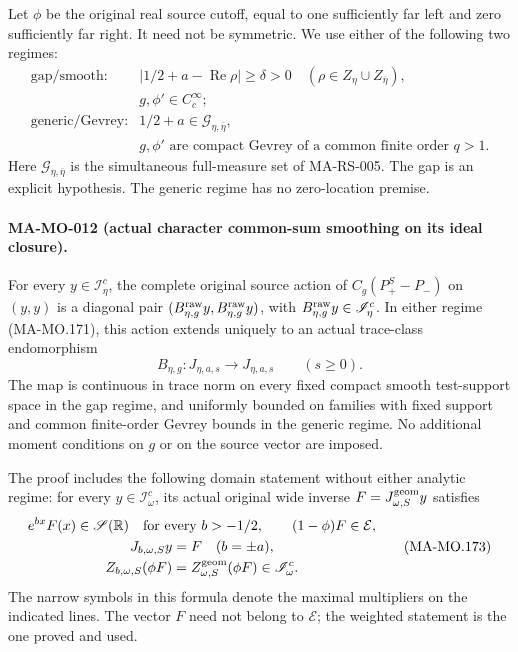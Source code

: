 Let \(\phi\) be the original real source cutoff, equal to one
sufficiently far left and zero sufficiently far right. It need not
be symmetric. We use either of the following two regimes:
\[
 \begin{array}{ll}
 \text{gap/smooth:}&
  |1/2+a-\operatorname{Re}\rho|\ge\delta>0
     \quad(\rho\in Z_\eta\cup Z_{\overline\eta}),\\
 &g,\phi'\in C_c^\infty;\\[2mm]
 \text{generic/Gevrey:}&
  1/2+a\in\mathscr G_{\eta,\overline\eta},\\
 &g,\phi'\text{ are compact Gevrey of a common finite order }q>1.
 \end{array}
 \tag{MA-MO.171}
\]
Here \(\mathscr G_{\eta,\overline\eta}\) is the simultaneous
full-measure set of MA-RS-005. The gap is an explicit hypothesis.
The generic regime has no
zero-location premise.

\paragraph{MA-MO-012 (actual character common-sum smoothing on its ideal closure).}
For every \(y\in\mathscr I^c_\eta\), the complete original
source action of \(C_g(P_+^S-P_-)\) on \((y,y)\) is a diagonal
pair \((B^{\rm raw}_{\eta,g}y,B^{\rm raw}_{\eta,g}y)\), with
\(B^{\rm raw}_{\eta,g}y\in\mathscr I^c_\eta\).
In either regime (MA-MO.171), this action extends uniquely to
an actual trace-class endomorphism
\[
                   B_{\eta,g}:J_{\eta,a,s}\longrightarrow J_{\eta,a,s}
                                      \qquad(s\ge0).
 \tag{MA-MO.172}
\]
The map is continuous in trace norm on every fixed compact smooth
test-support space in the gap regime, and uniformly bounded on
families with fixed support and common finite-order Gevrey bounds
in the generic regime. No additional moment conditions on \(g\)
or on the source vector are imposed.

The proof includes the following domain statement without either
analytic regime: for every \(y\in\mathscr I^c_\omega\), its actual
original wide inverse \(F=J^{\rm geom}_{\omega,S}y\) satisfies
\[
 \begin{gathered}
 e^{bx}F(x)\in\mathscr S(\mathbb R)\quad\hbox{for every }b>-1/2,
       \qquad (1-\phi)F\in\mathcal E,\\
 J_{b,\omega,S}y=F\quad(b=\pm a),\\
 Z_{b,\omega,S}(\phi F)=Z^{\rm geom}_{\omega,S}(\phi F)
                                         \in\mathscr I^c_\omega.
 \end{gathered}
 \tag{MA-MO.173}
\]
The narrow symbols in this formula denote the maximal multipliers
on the indicated lines. The vector \(F\) need not belong to
\(\mathcal E\); the weighted statement is the one proved and used.

